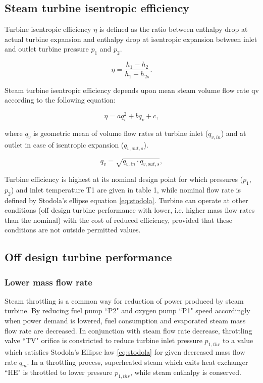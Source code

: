 \documentclass{article}
\begin{document}
	\subsection{Steam turbine isentropic efficiency}
	
	Turbine isentropic efficiency $\eta$ is defined as the ratio between enthalpy drop at actual turbine expansion and enthalpy drop at isentropic expansion between inlet and outlet turbine pressure $p_1$ and $p_2$.
	
	\begin{equation}\label{eq:eta}
		\eta = \frac{h_1-h_2}{h_1 - h_{2s}}.
	\end{equation}
	
	Steam turbine isentropic efficiency depends upon mean steam volume flow rate qv according to the following equation:
	
	\begin{equation}\label{eq:eta2}
		\eta = aq_v^2 + bq_v + c,
	\end{equation}
	
	\noindent
	where $q_v$ is geometric mean of volume flow rates at turbine inlet ($q_{v,in}$) and at outlet in case of isentropic expansion ($q_{v,out,s}$). 
	
	\begin{equation}\label{eq:q_v}
		q_v = \sqrt{q_{v,in} \cdot q_{v,out,s}},
	\end{equation}
	
	Turbine efficiency is highest at its nominal design point for which pressures ($p_1$, $p_2$) and inlet temperature T1 are given in table 1, while nominal flow rate is defined by Stodola’s ellipse equation \ref{eq:stodola}. Turbine can operate at other conditions (off design turbine performance with lower, i.e. higher mass flow rates than the nominal) with the cost of reduced efficiency, provided that these conditions are not outside permitted values.
	
	\subsection{Off design turbine performance}
	
	\subsubsection*{Lower mass flow rate}
	
	Steam throttling is a common way for reduction of power produced by steam turbine. By reducing fuel pump “P2" and oxygen pump “P1" speed accordingly when power demand is lowered, fuel consumption and evaporated steam mass flow rate are decreased. In conjunction with steam flow rate decrease, throttling valve “TV" orifice is constricted to reduce turbine inlet pressure $p_{1,thr}$ to a value which satisfies Stodola’s Ellipse law \ref{eq:stodola} for given decreased mass flow rate $q_m$. In a throttling process, superheated steam which exits heat exchanger “HE" is throttled to lower pressure $p_{1,thr}$, while steam enthalpy is conserved.
	
\end{document}
